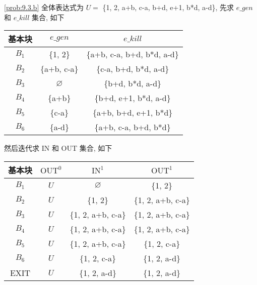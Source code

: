 \documentclass[boxes]{homework}
\begin{document}
\begin{solution}
    \ref{prob:9.3.b} 全体表达式为 $U = $ \{1, 2, a+b, c-a, b+d, e+1, b*d, a-d\},
    先求 $e\_gen$ 和 $e\_kill$ 集合, 如下
    \begin{center}
        \begin{tabular}{|c|c|c|}
            \hline
            基本块  & $e\_gen$      & $e\_kill$                   \\ \hline
            $B_{1}$ & \{1, 2\}      & \{a+b, c-a, b+d, b*d, a-d\} \\ \hline
            $B_{2}$ & \{a+b, c-a\}  & \{c-a, b+d, b*d, a-d\}      \\ \hline
            $B_{3}$ & $\varnothing$ & \{b+d, b*d, a-d\}           \\ \hline
            $B_{4}$ & \{a+b\}       & \{b+d, e+1, b*d, a-d\}      \\ \hline
            $B_{5}$ & \{c-a\}       & \{a+b, b+d, e+1, b*d\}      \\ \hline
            $B_{6}$ & \{a-d\}       & \{a+b, c-a, b+d, b*d\}      \\ \hline
        \end{tabular}
    \end{center}
    然后迭代求 IN 和 OUT 集合, 如下
    \begin{center}
        \begin{tabular}{|c|c|c|c|}
            \hline
            基本块  & $\mathrm{OUT}^{0}$ & $\mathrm{IN}^{1}$  & $\mathrm{OUT}^{1}$ \\ \hline
            $B_{1}$ & $U$                & $\varnothing$      & \{1, 2\}           \\ \hline
            $B_{2}$ & $U$                & \{1, 2\}           & \{1, 2, a+b, c-a\} \\ \hline
            $B_{3}$ & $U$                & \{1, 2, a+b, c-a\} & \{1, 2, a+b, c-a\} \\ \hline
            $B_{4}$ & $U$                & \{1, 2, a+b, c-a\} & \{1, 2, a+b, c-a\} \\ \hline
            $B_{5}$ & $U$                & \{1, 2, a+b, c-a\} & \{1, 2, c-a\}      \\ \hline
            $B_{6}$ & $U$                & \{1, 2, c-a\}      & \{1, 2, a-d\}      \\ \hline
            EXIT    & $U$                & \{1, 2, a-d\}      & \{1, 2, a-d\}      \\ \hline
        \end{tabular}
    \end{center}


\end{solution}
\end{document}
